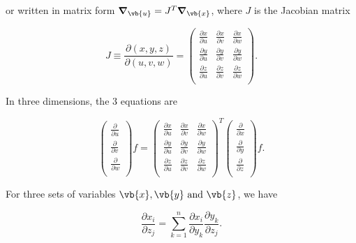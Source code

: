 \documentclass[english,a4paper,12pt]{report}
\begin{document}
or written in matrix form \(\boldsymbol{\nabla }_{\vb{u} } = J^T \boldsymbol{\nabla }_{\vb{x} }\), where \(J\) is the Jacobian matrix 

\begin{equation}
	J \equiv \frac{\partial (x,y,z)}{\partial (u,v,w)} = \begin{pmatrix}
		\frac{\partial x}{\partial u}  & \frac{\partial x}{\partial v}  & \frac{\partial x}{\partial w}   \\
		\frac{\partial y}{\partial u}  & \frac{\partial y}{\partial v}  & \frac{\partial y}{\partial w}   \\
		\frac{\partial z}{\partial u}  & \frac{\partial z}{\partial v}  & \frac{\partial z}{\partial w}   \\
	\end{pmatrix}.
\end{equation}

In three dimensions, the 3 equations are

\begin{equation} \label{jacobderi} 
	\begin{pmatrix}
		 \frac{\partial }{\partial u }  \\
		 \frac{\partial }{\partial v }  \\
		 \frac{\partial }{\partial w }  \\
	\end{pmatrix} f = \begin{pmatrix}
		\frac{\partial x}{\partial u}  & \frac{\partial x}{\partial v}  & \frac{\partial x}{\partial w}   \\
		\frac{\partial y}{\partial u}  & \frac{\partial y}{\partial v}  & \frac{\partial y}{\partial w}   \\
		\frac{\partial z}{\partial u}  & \frac{\partial z}{\partial v}  & \frac{\partial z}{\partial w}   \\
	\end{pmatrix}^T \begin{pmatrix}
		\frac{\partial }{\partial x }  \\
		\frac{\partial }{\partial y }  \\
		\frac{\partial }{\partial z }  \\
   \end{pmatrix} f.
\end{equation} 

For three sets of variables \(\vb{x} ,\vb{y} \text { and } \vb{z} \), we have

\begin{equation}
	\frac{\partial x_{i} }{\partial z_{j} } = \sum_{k=1}^{n} \frac{\partial x_{i} }{\partial y_{k} } \frac{\partial y_{k} }{\partial z_{j} }.   
\end{equation}
\end{document}
